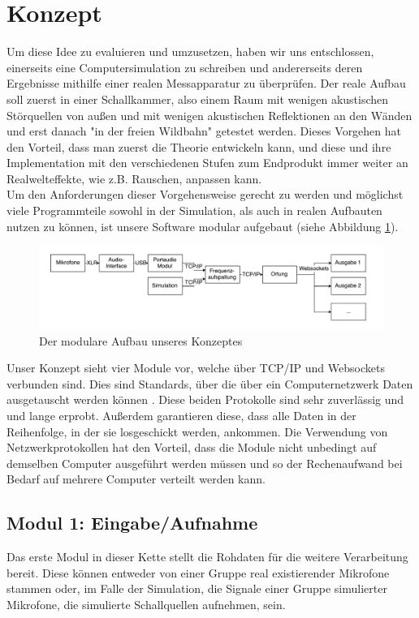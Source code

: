 \section{Konzept}
Um diese Idee zu evaluieren und umzusetzen, haben wir uns entschlossen, einerseits eine Computersimulation zu schreiben und andererseits deren Ergebnisse mithilfe einer realen Messapparatur zu überprüfen. Der reale Aufbau soll zuerst in einer Schallkammer, also einem Raum mit wenigen akustischen Störquellen von außen und mit wenigen akustischen Reflektionen an den Wänden und erst danach "in der freien Wildbahn" getestet werden. Dieses Vorgehen hat den Vorteil, dass man zuerst die Theorie entwickeln kann, und diese und ihre Implementation mit den verschiedenen Stufen zum  Endprodukt immer weiter an Realwelteffekte, wie z.B. Rauschen, anpassen kann.\\
Um den Anforderungen dieser Vorgehensweise gerecht zu werden und möglichst viele Programmteile sowohl in der Simulation, als auch in realen Aufbauten nutzen zu können, ist unsere Software modular aufgebaut (siehe Abbildung \ref{fig:flowchart}). 
\begin{figure}[H]
    \includegraphics[width=\linewidth]{img/flowchart}
	\caption{Der modulare Aufbau unseres Konzeptes} 
	\label{fig:flowchart}
\end{figure}
Unser Konzept sieht vier Module vor, welche über TCP/IP und Websockets verbunden sind. Dies sind Standards, über die über ein Computernetzwerk Daten ausgetauscht werden können \cite{tcp} \cite{websockets}. Diese beiden Protokolle sind sehr zuverlässig und und lange erprobt. Außerdem garantieren diese, dass alle Daten in der Reihenfolge, in der sie losgeschickt werden, ankommen. Die Verwendung von Netzwerkprotokollen hat den Vorteil, dass die Module nicht unbedingt auf demselben Computer ausgeführt werden müssen und so der Rechenaufwand bei Bedarf auf mehrere Computer verteilt werden kann.\\
\subsection{Modul 1: Eingabe/Aufnahme}
Das erste Modul in dieser Kette stellt die Rohdaten für die weitere Verarbeitung bereit. Diese  können entweder von einer Gruppe real existierender Mikrofone stammen oder, im Falle der Simulation, die Signale einer Gruppe simulierter Mikrofone, die simulierte Schallquellen aufnehmen, sein.

